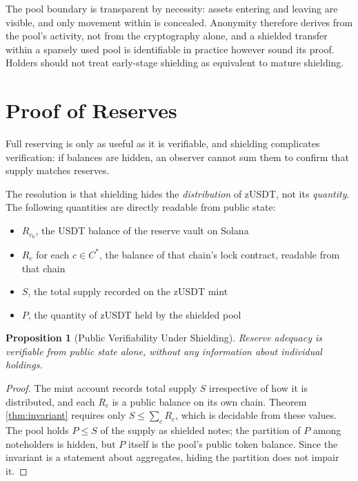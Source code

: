 \documentclass[11pt,a4paper]{article}
\newtheorem{proposition}[theorem]{Proposition}
\begin{document}
The pool boundary is transparent by necessity: assets entering and leaving are visible, and only movement within is concealed. Anonymity therefore derives from the pool's activity, not from the cryptography alone, and a shielded transfer within a sparsely used pool is identifiable in practice however sound its proof. Holders should not treat early-stage shielding as equivalent to mature shielding.

\section{Proof of Reserves}

Full reserving is only as useful as it is verifiable, and shielding complicates verification: if balances are hidden, an observer cannot sum them to confirm that supply matches reserves.

The resolution is that shielding hides the \emph{distribution} of zUSDT, not its \emph{quantity}. The following quantities are directly readable from public state:

\begin{itemize}
    \item $R_{c_0}$, the USDT balance of the reserve vault on Solana
    \item $R_c$ for each $c \in C^{*}$, the balance of that chain's lock contract, readable from that chain
    \item $S$, the total supply recorded on the zUSDT mint
    \item $P$, the quantity of zUSDT held by the shielded pool
\end{itemize}

\begin{proposition}[Public Verifiability Under Shielding]
\label{prop:verif}
Reserve adequacy is verifiable from public state alone, without any information about individual holdings.
\end{proposition}

\begin{proof}
The mint account records total supply $S$ irrespective of how it is distributed, and each $R_c$ is a public balance on its own chain. Theorem \ref{thm:invariant} requires only $S \leq \sum_c R_c$, which is decidable from these values. The pool holds $P \leq S$ of the supply as shielded notes; the partition of $P$ among noteholders is hidden, but $P$ itself is the pool's public token balance. Since the invariant is a statement about aggregates, hiding the partition does not impair it.
\end{proof}
\end{document}
